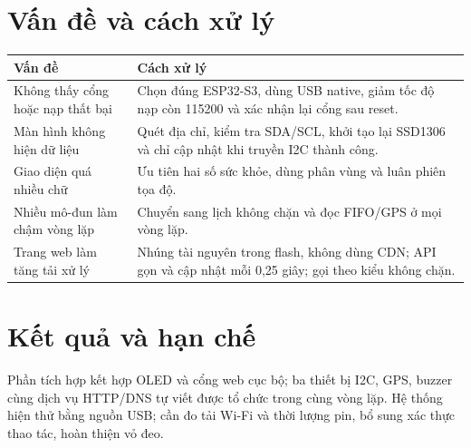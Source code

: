 \documentclass[12pt]{article}
\begin{document}
\section{Vấn đề và cách xử lý}

\begin{tabularx}{\textwidth}{Y Y}
\toprule
\textbf{Vấn đề} & \textbf{Cách xử lý}\\
\midrule
Không thấy cổng hoặc nạp thất bại & Chọn đúng ESP32-S3, dùng USB native, giảm tốc độ nạp còn 115200 và xác nhận lại cổng sau reset.\\
Màn hình không hiện dữ liệu & Quét địa chỉ, kiểm tra SDA/SCL, khởi tạo lại SSD1306 và chỉ cập nhật khi truyền I2C thành công.\\
Giao diện quá nhiều chữ & Ưu tiên hai số sức khỏe, dùng phân vùng và luân phiên tọa độ.\\
Nhiều mô-đun làm chậm vòng lặp & Chuyển sang lịch không chặn và đọc FIFO/GPS ở mọi vòng lặp.\\
Trang web làm tăng tải xử lý & Nhúng tài nguyên trong flash, không dùng CDN; API gọn và cập nhật mỗi 0,25 giây; gọi  theo kiểu không chặn.\\
\bottomrule
\end{tabularx}

\section{Kết quả và hạn chế}

Phần tích hợp kết hợp OLED và cổng web cục bộ; ba thiết bị I2C, GPS, buzzer cùng dịch vụ HTTP/DNS tự viết được tổ chức trong cùng vòng lặp. Hệ thống hiện thử bằng nguồn USB; cần đo tải Wi-Fi và thời lượng pin, bổ sung xác thực thao tác, hoàn thiện vỏ đeo.
\end{document}
